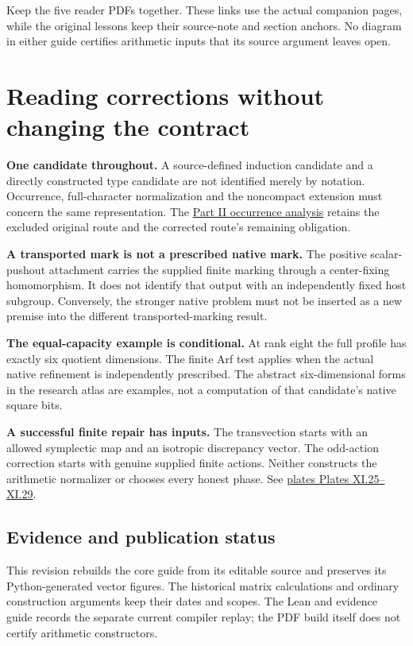 Keep the five reader PDFs together. These links use the actual companion pages, while the original lessons keep their source-note and section anchors. No diagram in either guide certifies arithmetic inputs that its source argument leaves open.
\clearpage
\section*{Reading corrections without changing the contract}
{}
\textbf{One candidate throughout.} A source-defined induction candidate and a directly constructed type candidate are not identified merely by notation. Occurrence, full-character normalization and the noncompact extension must concern the same representation. The \href{https://komorebi.invalid/b07/visual_occurrence}{Part II occurrence analysis} retains the excluded original route and the corrected route's remaining obligation.

\textbf{A transported mark is not a prescribed native mark.} The positive scalar-pushout attachment carries the supplied finite marking through a center-fixing homomorphism. It does not identify that output with an independently fixed host subgroup. Conversely, the stronger native problem must not be inserted as a new premise into the different transported-marking result.

\textbf{The equal-capacity example is conditional.} At rank eight the full profile has exactly six quotient dimensions. The finite Arf test applies when the actual native refinement is independently prescribed. The abstract six-dimensional forms in the research atlas are examples, not a computation of that candidate's native square bits.

\textbf{A successful finite repair has inputs.} The transvection starts with an allowed symplectic map and an isotropic discrepancy vector. The odd-action correction starts with genuine supplied finite actions. Neither constructs the arithmetic normalizer or chooses every honest phase. See \href{https://komorebi.invalid/b07/visual_repairs}{plates Plates XI.25--XI.29}.

\subsection*{Evidence and publication status}
This revision rebuilds the core guide from its editable source and preserves its Python-generated vector figures. The historical matrix calculations and ordinary construction arguments keep their dates and scopes. The Lean and evidence guide records the separate current compiler replay; the PDF build itself does not certify arithmetic constructors.


